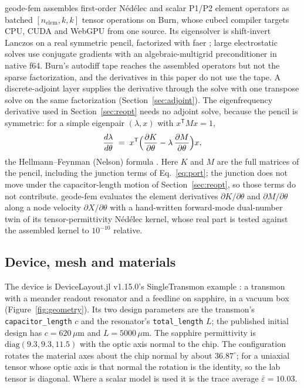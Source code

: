 \documentclass{anvil-paper}
\begin{document}
geode-fem assembles first-order N\'ed\'elec \citep{nedelec1980} and
scalar P1/P2 element operators as batched $[n_{\mathrm{elem}},k,k]$ tensor
operations on Burn, whose cubecl compiler targets CPU, CUDA and WebGPU
from one source. Its eigensolver is shift-invert Lanczos \citep{arpack} on
a real symmetric pencil, factorized with faer \citep{kazdadi2026faer};
large electrostatic solves use conjugate gradients with an
algebraic-multigrid preconditioner in native f64. Burn's autodiff tape
reaches the assembled operators but not the sparse factorization, and the
derivatives in this paper do not use the tape. A discrete-adjoint layer
supplies the derivative through the solve with one transpose solve on the
same factorization (Section~\ref{sec:adjoint}). The eigenfrequency
derivative used in Section~\ref{sec:reopt} needs no adjoint solve, because
the pencil is symmetric: for a simple eigenpair $(\lambda, x)$ with
$x^{\mathsf T}Mx = 1$,
\begin{equation}
  \frac{d\lambda}{d\theta} \;=\;
  x^{\mathsf T}\Bigl(\frac{\partial K}{\partial\theta}
  - \lambda\,\frac{\partial M}{\partial\theta}\Bigr)x ,
  \label{eq:hf-eig}
\end{equation}
the Hellmann--Feynman (Nelson) formula \citep{nelson1976simplified}. Here
$K$ and $M$ are the full matrices of the pencil, including the junction
terms of Eq.~\eqref{eq:port}; the junction does not move under the
capacitor-length motion of Section~\ref{sec:reopt}, so those terms do not
contribute. geode-fem evaluates the element derivatives
$\partial K/\partial\theta$ and $\partial M/\partial\theta$ along a node
velocity $\partial X/\partial\theta$ with a hand-written forward-mode
dual-number twin of its tensor-permittivity N\'ed\'elec kernel, whose real
part is tested against the assembled kernel to $10^{-10}$ relative.

\subsection{Device, mesh and materials}
\label{sec:geometry}

The device is DeviceLayout.jl v1.15.0's SingleTransmon example
\citep{devicelayout}: a transmon with a meander readout resonator and a
feedline on sapphire, in a vacuum box (Figure~\ref{fig:geometry}). Its two
design parameters are the transmon's \texttt{capacitor\_length} $c$ and the
resonator's \texttt{total\_length} $L$; the published initial design has
$c = 620\,\mu$m and $L = 5000\,\mu$m. The sapphire permittivity is
$\mathrm{diag}(9.3, 9.3, 11.5)$ with the optic axis normal to the chip.
The configuration rotates the material axes about the chip normal by
about $36.87^\circ$; for a uniaxial tensor whose optic axis is that normal
the rotation is the identity, so the lab tensor is diagonal. Where a
scalar model is used it is the trace average $\bar\varepsilon = 10.03$.
\end{document}
